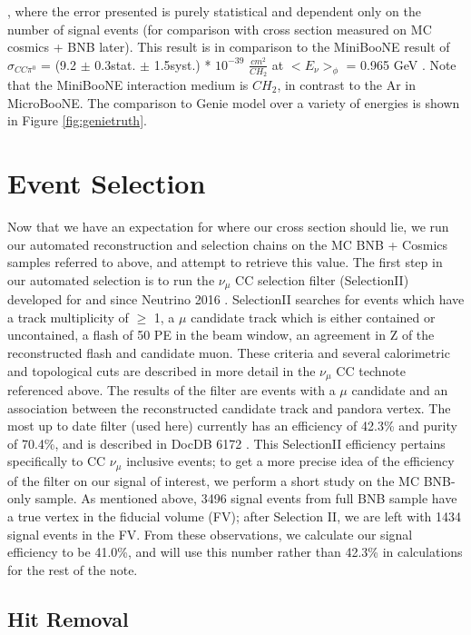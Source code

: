 \documentclass[a4paper]{article}
\begin{document}
, where the error presented is purely statistical and dependent only on the number of signal events (for comparison with cross section measured on MC cosmics + BNB later).  This result is in comparison to the MiniBooNE result of $\sigma_{CC\pi^0}$ = (9.2 $\pm$ 0.3stat. $\pm$ 1.5syst.) * $10^{-39}$ $\frac{cm^2}{CH_2}$ at $<E_\nu>_\phi$ = 0.965 GeV \cite{bib:numucc_miniboone}.  Note that the MiniBooNE interaction medium is $CH_2$, in contrast to the Ar in MicroBooNE. The comparison to Genie model over a variety of energies is shown in Figure \ref{fig:genietruth}.


\section{Event Selection}
Now that we have an expectation for where our cross section should lie, we run our automated reconstruction and selection chains on the MC BNB + Cosmics samples referred to above, and attempt to retrieve this value. \noindent The first step in our automated selection is to run the $\nu_\mu$ CC selection filter (SelectionII) developed for and since Neutrino 2016 \cite{bib:numucc}.  SelectionII searches for events which have a track multiplicity of $\geq$ 1, a $\mu$ candidate track which is either contained or uncontained, a flash of 50 PE in the beam window, an agreement in Z of the reconstructed flash and candidate muon. These criteria and several calorimetric and topological cuts are described in more detail in the $\nu_\mu$ CC technote referenced above. The results of the filter are events with a $\mu$ candidate and an association between the reconstructed candidate track and pandora vertex. The most up to date filter (used here) currently has an efficiency of 42.3\% and purity of 70.4\%, and is described in DocDB 6172 \cite{bib:6172}. This SelectionII efficiency pertains specifically to CC $\nu_\mu$ inclusive events; to get a more precise idea of the efficiency of the filter on our signal of interest, we perform a short study on the MC BNB-only sample.  As mentioned above, 3496 signal events from full BNB sample have a true vertex in the fiducial volume (FV); after Selection II, we are left with 1434 signal events in the FV.  From these observations, we calculate our signal efficiency to be 41.0\%, and will use this number rather than 42.3\% in calculations for the rest of the note.

\subsection{Hit Removal}
\end{document}
